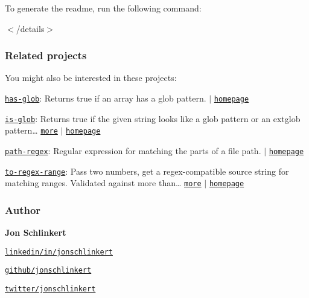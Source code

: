 To generate the readme, run the following command\+:




$<$/details$>$

\subsubsection*{Related projects}

You might also be interested in these projects\+:


\begin{DoxyItemize}
\item \href{https://www.npmjs.com/package/has-glob}{\tt has-\/glob}\+: Returns {\ttfamily true} if an array has a glob pattern. $\vert$ \href{https://github.com/jonschlinkert/has-glob}{\tt homepage}
\item \href{https://www.npmjs.com/package/is-glob}{\tt is-\/glob}\+: Returns {\ttfamily true} if the given string looks like a glob pattern or an extglob pattern… \href{https://github.com/jonschlinkert/is-glob}{\tt more} $\vert$ \href{https://github.com/jonschlinkert/is-glob}{\tt homepage}
\item \href{https://www.npmjs.com/package/path-regex}{\tt path-\/regex}\+: Regular expression for matching the parts of a file path. $\vert$ \href{https://github.com/regexps/path-regex}{\tt homepage}
\item \href{https://www.npmjs.com/package/to-regex-range}{\tt to-\/regex-\/range}\+: Pass two numbers, get a regex-\/compatible source string for matching ranges. Validated against more than… \href{https://github.com/micromatch/to-regex-range}{\tt more} $\vert$ \href{https://github.com/micromatch/to-regex-range}{\tt homepage}
\end{DoxyItemize}

\subsubsection*{Author}

{\bfseries Jon Schlinkert}


\begin{DoxyItemize}
\item \href{https://linkedin.com/in/jonschlinkert}{\tt linkedin/in/jonschlinkert}
\item \href{https://github.com/jonschlinkert}{\tt github/jonschlinkert}
\item \href{https://twitter.com/jonschlinkert}{\tt twitter/jonschlinkert}
\end{DoxyItemize}

